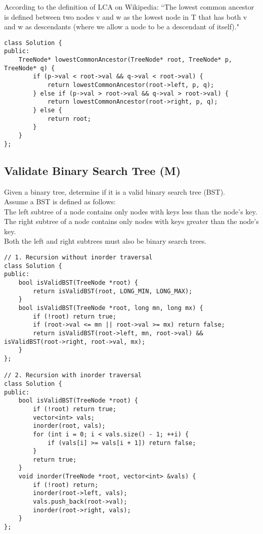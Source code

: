 According to the definition of LCA on Wikipedia: ``The lowest common ancestor is defined between two nodes v and w as the lowest node in T that has both v and w as descendants (where we allow a node to be a descendant of itself)." \\

\begin{lstlisting}
class Solution {
public:
    TreeNode* lowestCommonAncestor(TreeNode* root, TreeNode* p, TreeNode* q) {
        if (p->val < root->val && q->val < root->val) {
            return lowestCommonAncestor(root->left, p, q);
        } else if (p->val > root->val && q->val > root->val) {
            return lowestCommonAncestor(root->right, p, q);
        } else {
            return root;
        }     
    }
};
\end{lstlisting}


\subsection{Validate Binary Search Tree (M)}
Given a binary tree, determine if it is a valid binary search tree (BST).\\

Assume a BST is defined as follows:\\
    The left subtree of a node contains only nodes with keys less than the node's key.\\
    The right subtree of a node contains only nodes with keys greater than the node's key.\\
    Both the left and right subtrees must also be binary search trees.\\

\begin{lstlisting}
// 1. Recursion without inorder traversal
class Solution {
public:
    bool isValidBST(TreeNode *root) {
        return isValidBST(root, LONG_MIN, LONG_MAX);
    }
    bool isValidBST(TreeNode *root, long mn, long mx) {
        if (!root) return true;
        if (root->val <= mn || root->val >= mx) return false;
        return isValidBST(root->left, mn, root->val) && isValidBST(root->right, root->val, mx);
    }
};

// 2. Recursion with inorder traversal
class Solution {
public:
    bool isValidBST(TreeNode *root) {
        if (!root) return true;
        vector<int> vals;
        inorder(root, vals);
        for (int i = 0; i < vals.size() - 1; ++i) {
            if (vals[i] >= vals[i + 1]) return false;
        }
        return true;
    }
    void inorder(TreeNode *root, vector<int> &vals) {
        if (!root) return;
        inorder(root->left, vals);
        vals.push_back(root->val);
        inorder(root->right, vals);
    }
};
\end{lstlisting}


